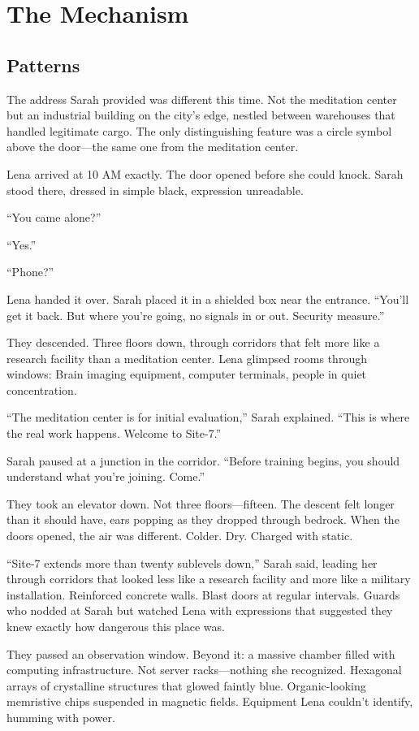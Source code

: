\part{The Mechanism}

\chapter{Patterns}

The address Sarah provided was different this time. Not the meditation center but an industrial building on the city's edge, nestled between warehouses that handled legitimate cargo. The only distinguishing feature was a circle symbol above the door—the same one from the meditation center.

Lena arrived at 10 AM exactly. The door opened before she could knock. Sarah stood there, dressed in simple black, expression unreadable.

``You came alone?''

``Yes.''

``Phone?''

Lena handed it over. Sarah placed it in a shielded box near the entrance. ``You'll get it back. But where you're going, no signals in or out. Security measure.''

They descended. Three floors down, through corridors that felt more like a research facility than a meditation center. Lena glimpsed rooms through windows: Brain imaging equipment, computer terminals, people in quiet concentration.

``The meditation center is for initial evaluation,'' Sarah explained. ``This is where the real work happens. Welcome to Site-7.''

Sarah paused at a junction in the corridor. ``Before training begins, you should understand what you're joining. Come.''

They took an elevator down. Not three floors—fifteen. The descent felt longer than it should have, ears popping as they dropped through bedrock. When the doors opened, the air was different. Colder. Dry. Charged with static.

``Site-7 extends more than twenty sublevels down,'' Sarah said, leading her through corridors that looked less like a research facility and more like a military installation. Reinforced concrete walls. Blast doors at regular intervals. Guards who nodded at Sarah but watched Lena with expressions that suggested they knew exactly how dangerous this place was.

They passed an observation window. Beyond it: a massive chamber filled with computing infrastructure. Not server racks—nothing she recognized. Hexagonal arrays of crystalline structures that glowed faintly blue. Organic-looking memristive chips suspended in magnetic fields. Equipment Lena couldn't identify, humming with power.

